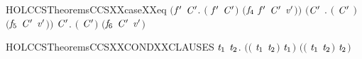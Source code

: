 \begin{SaveVerbatim}{HOLCCSTheoremsCCSXXcaseXXeq}
   \ensuremath{(}\HOLSymConst{\HOLTokenExists{}}\ensuremath{\HOLBoundVar{f}\sp{\prime}} \ensuremath{\HOLBoundVar{C}\sp{\prime}}. \ensuremath{(} \HOLSymConst{\ensuremath{=}}  \ensuremath{\HOLBoundVar{f}\sp{\prime}} \ensuremath{\HOLBoundVar{C}\sp{\prime}}\ensuremath{)} \HOLSymConst{\HOLTokenConj{}} \ensuremath{(}\ensuremath{\HOLFreeVar{f}\sb{\mathrm{4}}} \ensuremath{\HOLBoundVar{f}\sp{\prime}} \ensuremath{\HOLBoundVar{C}\sp{\prime}} \HOLSymConst{\ensuremath{=}} \ensuremath{\HOLFreeVar{v}\sp{\prime}}\ensuremath{)}\ensuremath{)} \HOLSymConst{\HOLTokenDisj{}}
   \ensuremath{(}\HOLSymConst{\HOLTokenExists{}}\ensuremath{\HOLBoundVar{C}\sp{\prime}} . \ensuremath{(} \HOLSymConst{\ensuremath{=}}  \ensuremath{\HOLBoundVar{C}\sp{\prime}} \ensuremath{)} \HOLSymConst{\HOLTokenConj{}} \ensuremath{(}\ensuremath{\HOLFreeVar{f}\sb{\mathrm{5}}} \ensuremath{\HOLBoundVar{C}\sp{\prime}}  \HOLSymConst{\ensuremath{=}} \ensuremath{\HOLFreeVar{v}\sp{\prime}}\ensuremath{)}\ensuremath{)} \HOLSymConst{\HOLTokenDisj{}}
   \HOLSymConst{\HOLTokenExists{}} \ensuremath{\HOLBoundVar{C}\sp{\prime}}. \ensuremath{(} \HOLSymConst{\ensuremath{=}}   \ensuremath{\HOLBoundVar{C}\sp{\prime}}\ensuremath{)} \HOLSymConst{\HOLTokenConj{}} \ensuremath{(}\ensuremath{\HOLFreeVar{f}\sb{\mathrm{6}}}  \ensuremath{\HOLBoundVar{C}\sp{\prime}} \HOLSymConst{\ensuremath{=}} \ensuremath{\HOLFreeVar{v}\sp{\prime}}\ensuremath{)}
\end{SaveVerbatim}
\newcommand{\HOLCCSTheoremsCCSXXcaseXXeq}{\UseVerbatim{HOLCCSTheoremsCCSXXcaseXXeq}}
\begin{SaveVerbatim}{HOLCCSTheoremsCCSXXCONDXXCLAUSES}
\HOLTokenTurnstile{} \HOLSymConst{\HOLTokenForall{}}\ensuremath{\HOLBoundVar{t}\sb{\mathrm{1}}} \ensuremath{\HOLBoundVar{t}\sb{\mathrm{2}}}.
       \ensuremath{(}\ensuremath{(}   \ensuremath{\HOLBoundVar{t}\sb{\mathrm{1}}}  \ensuremath{\HOLBoundVar{t}\sb{\mathrm{2}}}\ensuremath{)} \HOLSymConst{\ensuremath{=}} \ensuremath{\HOLBoundVar{t}\sb{\mathrm{1}}}\ensuremath{)} \HOLSymConst{\HOLTokenConj{}}
       \ensuremath{(}\ensuremath{(}   \ensuremath{\HOLBoundVar{t}\sb{\mathrm{1}}}  \ensuremath{\HOLBoundVar{t}\sb{\mathrm{2}}}\ensuremath{)} \HOLSymConst{\ensuremath{=}} \ensuremath{\HOLBoundVar{t}\sb{\mathrm{2}}}\ensuremath{)}
\end{SaveVerbatim}
